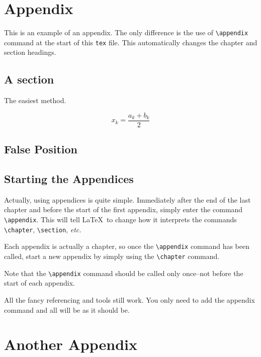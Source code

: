 \appendix
\chapter{Appendix}
This is an example of an appendix. 
The only difference is the use of \verb+\appendix+ command at the start of this \texttt{tex} file. 
This automatically changes the chapter and section headings.

\section{A section}
The easiest method.

\begin{equation}\label{eq:sum}
    x_k = \frac{a_k+b_k}{2}
\end{equation}

\section{False Position}
\lipsum[20]


\section{Starting the Appendices}
Actually, using appendices is quite simple.  Immediately after the end
of the last chapter and before the start of the first appendix, simply
enter the command \verb|\appendix|.  This will tell \LaTeX~to change
how it interprets the commands \verb|\chapter|, \verb|\section|,
\textit{etc.}

Each appendix is actually a chapter, so once the \verb|\appendix|
command has been called, start a new appendix by simply using the
\verb|\chapter| command.

Note that the \verb|\appendix| command should be called only
once--not before the start of each appendix.

All the fancy referencing and tools still work.
You only need to add the appendix command and all will be as it should be.

\chapter{Another Appendix}
\lipsum[24]
